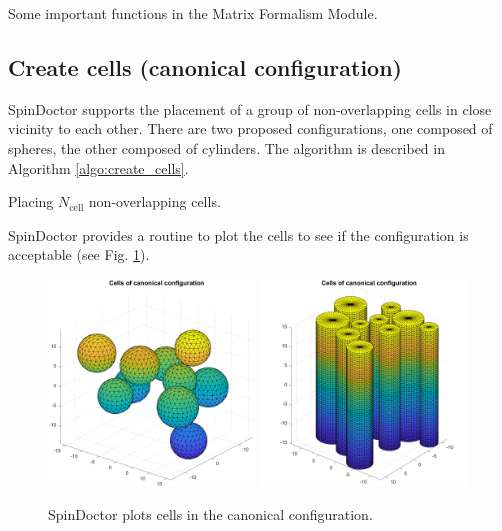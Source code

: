 \documentclass[a4paper]{article}
\begin{document}
\begin{table}
    \centering
    
    \caption{Some important functions in the Matrix Formalism Module.}
    \label{table:functions_mf}
\end{table}



\subsection{Create cells (canonical configuration)}

SpinDoctor supports the placement of a group of non-overlapping cells in close vicinity to each other. There are two proposed configurations, one composed of spheres, the other composed of cylinders. The algorithm is described in Algorithm \ref{algo:create_cells}.

\begin{algorithm}
    
    \caption{Placing $N_\text{cell}$ non-overlapping cells.}
    \label{algo:create_cells}
\end{algorithm}

SpinDoctor provides a routine to plot the cells to see if the configuration is acceptable (see Fig. \ref{fig:plot_cells}).
\begin{figure}
    \centering
    \includegraphics[width=0.49\textwidth]{plot_cells/spheres.png}
    \includegraphics[width=0.49\textwidth]{plot_cells/cylinders.png}
    \caption{SpinDoctor plots cells in the canonical configuration.}
    \label{fig:plot_cells}
\end{figure}
\end{document}
